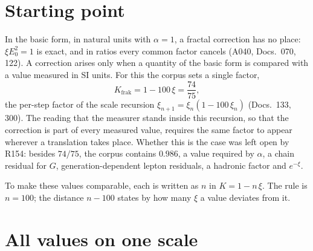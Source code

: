 \section{Starting point}

In the basic form, in natural units with $\alpha=1$, a fractal correction has no place: $\xi
E_0^2=1$ is exact, and in ratios every common factor cancels (A040, Docs.~070, 122). A correction
arises only when a quantity of the basic form is compared with a value measured in SI units. For
this the corpus sets a single factor,
\begin{equation}
  K_{\text{frak}}=1-100\,\xi=\frac{74}{75},
\end{equation}
the per-step factor of the scale recursion $\xi_{n+1}=\xi_n(1-100\,\xi_n)$ (Docs.~133, 300). The
reading that the measurer stands inside this recursion, so that the correction is part of every
measured value, requires the same factor to appear wherever a translation takes place. Whether this
is the case was left open by R154: besides $74/75$, the corpus contains $0.986$, a value required by
$\alpha$, a chain residual for $G$, generation-dependent lepton residuals, a hadronic factor and
$e^{-\xi}$.

To make these values comparable, each is written as $n$ in $K=1-n\,\xi$. The rule is $n=100$; the
distance $n-100$ states by how many $\xi$ a value deviates from it.

\section{All values on one scale}

